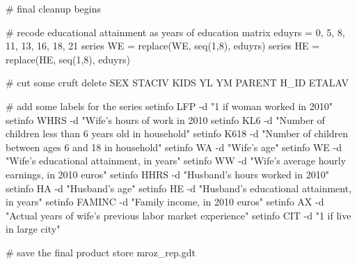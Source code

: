 \begin{code}
# final cleanup begins

# recode educational attainment as years of education
matrix eduyrs = {0, 5, 8, 11, 13, 16, 18, 21}
series WE = replace(WE, seq(1,8), eduyrs)
series HE = replace(HE, seq(1,8), eduyrs)

# cut some cruft
delete SEX STACIV KIDS YL YM PARENT H_ID ETALAV

# add some labels for the series
setinfo LFP -d "1 if woman worked in 2010"
setinfo WHRS -d "Wife's hours of work in 2010
setinfo KL6 -d "Number of children less than 6 years old in household"
setinfo K618 -d "Number of children between ages 6 and 18 in household"
setinfo WA -d "Wife's age"
setinfo WE -d "Wife's educational attainment, in years"
setinfo WW -d "Wife's average hourly earnings, in 2010 euros"
setinfo HHRS -d "Husband's hours worked in 2010"
setinfo HA -d "Husband's age"
setinfo HE -d "Husband's educational attainment, in years"
setinfo FAMINC -d "Family income, in 2010 euros"
setinfo AX -d "Actual years of wife's previous labor market experience"
setinfo CIT -d "1 if live in large city"

# save the final product
store mroz_rep.gdt
\end{code}

    
